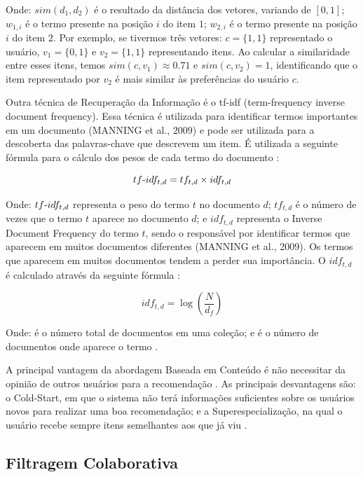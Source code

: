 Onde: $sim(d_1, d_2)$ é o resultado da distância dos vetores, variando de $[0,1]$; $w_{1,i}$ é o termo presente na
posição $i$ do item $1$; $w_{2,i}$ é o termo presente na posição $i$ do item $2$. Por exemplo, se tivermos três vetores: $c = \{1,1\}$
representado o usuário, $v_1 = \{0, 1\}$ e $v_2 = \{1, 1\}$ representando itens. Ao calcular a similaridade entre esses itens,
temos $sim(c, v_1) \approx 0.71$ e $sim(c, v_2) = 1$, identificando que o item representado por $v_2$ é mais similar às
preferências do usuário $c$.

Outra técnica de Recuperação da Informação é o tf-idf (term-frequency inverse document frequency). Essa técnica
é utilizada para identificar termos importantes em um documento (MANNING et al., 2009) e pode ser utilizada
para a descoberta das palavras-chave que descrevem um item. É utilizada a seguinte fórmula para o cálculo dos
pesos de cada termo do documento \cite{christopher2008introduction}:

\begin{equation}
  tf\hbox{-}idf_{t,d} = tf_{t,d} \times idf_{t,d}
  \label{eq:tf-idf}
\end{equation}

Onde: $tf\hbox{-}idf_{t,d}$ representa o peso do termo $t$ no documento $d$; $tf_{t,d}$ é o número de vezes que o termo
$t$ aparece no documento $d$; e $idf_{t,d}$ representa o Inverse Document Frequency do termo $t$, sendo o responsável por
identificar termos que aparecem em muitos documentos diferentes (MANNING et al., 2009). Os termos que aparecem em muitos
documentos tendem a perder sua importância. O $idf_{t,d}$ é calculado através da seguinte fórmula \cite{christopher2008introduction}:

\begin{equation}
  idf_{t,d} = \log(\frac{N}{d_f})
  \label{eq:idf}
\end{equation}

Onde:  é o número total de documentos em uma coleção; e  é o número de documentos onde aparece o termo .

A principal vantagem da abordagem Baseada em Conteúdo é não necessitar da opinião de outros usuários para a recomendação
\cite{ricci2011introduction}. As principais desvantagens são: o Cold-Start, em que o sistema não terá informações
suficientes sobre os usuários novos para realizar uma boa recomendação; e a Superespecialização, na qual o
usuário recebe sempre itens semelhantes aos que já viu \cite{lops2011content}.

\subsection{Filtragem Colaborativa}

